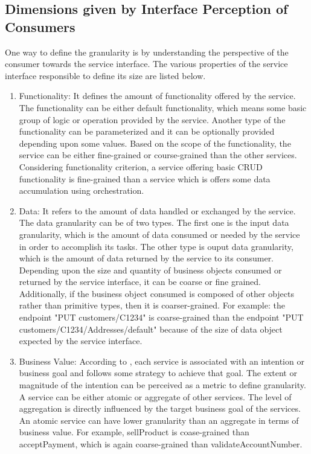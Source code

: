 \subsection{Dimensions given by Interface Perception of Consumers}\label{subsection:granularity/dimensions/interface}
One way to define the granularity is by understanding the perspective of the consumer towards the service interface. The various properties of the service interface responsible to define its size are listed below.
\begin{enumerate}
\item Functionality: It defines the amount of functionality offered by the service. The functionality can be either default functionality, which means some basic group of logic or operation provided by the service. Another type of the functionality can be parameterized and it can be optionally provided depending upon some values. Based on the scope of the functionality, the service can be either fine-grained or course-grained than the other services. Considering functionality criterion, a service offering basic \acrshort{CRUD} functionality is fine-grained than a service which is offers some data accumulation using orchestration. \cite{Raf-Haesen:2015aa}
\\
\item Data: It refers to the amount of data handled or exchanged by the service. The data granularity can be of two types. The first one is the input data granularity, which is the amount of data consumed or needed by the service in order to accomplish its tasks. The other type is ouput data granularity, which is the amount of data returned by the service to its consumer. Depending upon the size and quantity of business objects consumed or returned by the service interface, it can be coarse or fine grained. Additionally, if the business object consumed is composed of other objects rather than primitive types, then it is coarser-grained. For example: the endpoint "PUT customers/C1234" is coarse-grained than the endpoint "PUT customers/C1234/Addresses/default" because of the size of data object expected by the service interface. \cite{Raf-Haesen:2015aa}
\\
\item Business Value: According to \cite{Rolland:2015aa}, each service is associated with an intention or business goal and follows some strategy to achieve that goal. The extent or magnitude of the intention can be perceived as a metric to define granularity. A service can be either atomic or aggregate of other services. The level of aggregation is directly influenced by the target business goal of the services. An atomic service can have lower granularity than an aggregate in terms of business value. For example, sellProduct is coase-grained than acceptPayment, which is again coarse-grained than validateAccountNumber. \cite{Raf-Haesen:2015aa}
\end{enumerate}

